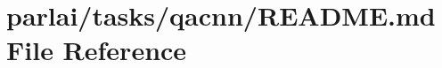 \hypertarget{parlai_2tasks_2qacnn_2README_8md}{}\section{parlai/tasks/qacnn/\+R\+E\+A\+D\+ME.md File Reference}
\label{parlai_2tasks_2qacnn_2README_8md}
